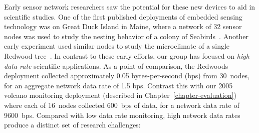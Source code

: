 Early sensor network researchers saw the potential for these new devices to
aid in scientific studies. One of the first published deployments of embedded
sensing technology was on Great Duck Island in Maine, where a network of 32
sensor nodes was used to study the nesting behavior of a colony of
Seabirds~\cite{gdi-sensys04}. Another early experiment used similar nodes to
study the microclimate of a single Redwood tree~\cite{berkeley-redwoods}. In
contrast to these early efforts, our group has focused on \textit{high data
rate} scientific applications. As a point of comparison, the Redwoods
deployment collected approximately 0.05 bytes-per-second (bps) from 30~nodes,
for an aggregate network data rate of 1.5 bps. Contrast this with our 2005
volcano monitoring deployment (described in Chapter~\ref{chapter-evaluation})
where each of 16~nodes collected 600~bps of data, for a network data rate of
9600~bps. Compared with low data rate monitoring, high network data rates
produce a distinct set of research challenges:

